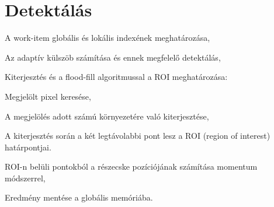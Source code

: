 \section{Detektálás}
	\begin{enumerate*}
		\item A work-item globális és lokális indexének meghatározása,
		\item Az adaptív külszöb számítása és ennek megfelelő detektálás,
		\item Kiterjesztés és a flood-fill algoritmussal a ROI meghatározása:
		\begin{enumerate*}
			\item Megjelölt pixel keresése,
			\item A megjelölés adott számú környezetére való kiterjesztése,
			\item A kiterjesztés során a két legtávolabbi pont lesz a ROI (region of interest) határpontjai.
		\end{enumerate*}
		\item ROI-n belüli pontokból a részecske pozíciójának számítása momentum módszerrel,
		\item Eredmény mentése a globális memóriába.
	\end{enumerate*}
	
	